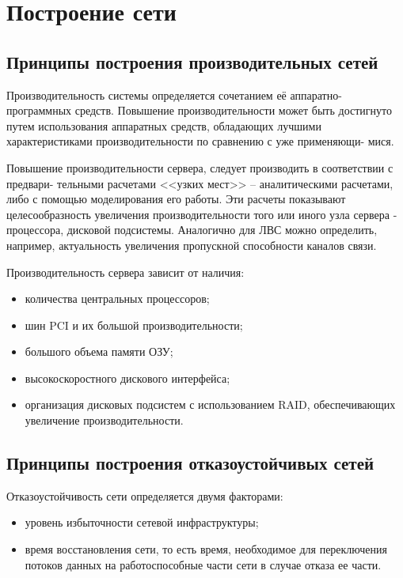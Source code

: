 \documentclass[russian,utf8,emptystyle]{eskdtext}
\begin{document}
\clearpage
\section{Построение сети}
\subsection{Принципы построения производительных сетей}

Производительность системы определяется сочетанием её аппаратно- программных средств.
Повышение производительности может быть достигнуто путем использования аппаратных средств,
обладающих лучшими характеристиками производительности по сравнению с уже применяющи-
мися.

Повышение производительности сервера, следует производить в соответствии с предвари-
тельными расчетами <<узких мест>> – аналитическими расчетами, либо с помощью моделирования
его работы. Эти расчеты показывают целесообразность увеличения производительности того или
иного узла сервера - процессора, дисковой подсистемы. Аналогично для ЛВС можно определить,
например, актуальность увеличения пропускной способности каналов связи.

Производительность сервера зависит от наличия:
\begin{itemize}[label=-]
\item количества центральных процессоров;
\item шин PCI и их большой производительности;
\item большого объема памяти ОЗУ;
\item высокоскоростного дискового интерфейса;
\item организация дисковых подсистем с использованием RAID, обеспечивающих увеличение производительности.
\end{itemize}


\subsection{Принципы построения отказоустойчивых сетей}
Отказоустойчивость сети определяется двумя факторами:
\begin{itemize}[label=-]
\item уровень избыточности сетевой инфраструктуры;
\item время восстановления сети, то есть время, необходимое для переключения потоков данных
на работоспособные части сети в случае отказа ее части.
\end{itemize}
\end{document}
